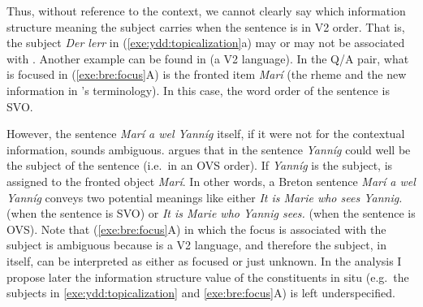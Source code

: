\noindent Thus, without reference to the context, we cannot clearly
say which information structure meaning the subject carries when the
sentence is in V2 order. That is, the subject \textit{Der
  ler{\textschwa}r} in (\ref{exe:ydd:topicalization}a) may or may not
be associated with .  Another example can be found in
 (a V2 language). In the Q/A pair, what
is focused in (\ref{exe:bre:focus}A) is the fronted item
\textit{Mar\'i} (the rheme and the new information in
\citeauthor{press:86}'s terminology). In this case, the word order of the
sentence is SVO.


\noindent However, the sentence \textit{Mar\'i a wel Yann\'ig} itself,
if it were not for the contextual information, sounds
ambiguous. \citeauthor{press:86} argues that in the sentence
\textit{Yann\'ig} could well be the subject of the sentence (i.e.\ in
an OVS order). If \textit{Yann\'ig} is the subject,  is
assigned to the fronted object \textit{Mar\'i}. In other words, a
Breton sentence \textit{Mar\'i a wel Yann\'ig} conveys two potential
meanings like either \textit{It is Marie who sees Yannig.} (when the
sentence is SVO) or \textit{It is Marie who Yannig sees.} (when the
sentence is OVS).  Note that (\ref{exe:bre:focus}A) in which the focus
is associated with the subject is ambiguous because  is a
V2 language, and therefore the subject, in itself,
can be interpreted as either as focused or just unknown. In the
analysis I propose later the information structure value of the
constituents in situ (e.g.\ the subjects in
\ref{exe:ydd:topicalization} and \ref{exe:bre:focus}A) is left
underspecified.



